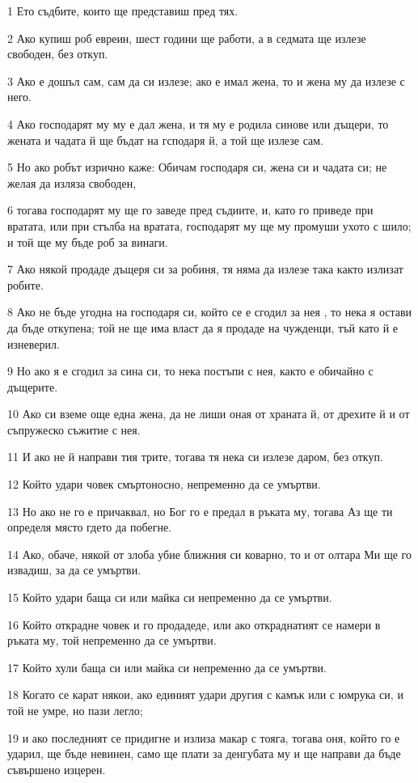 \par 1 Ето съдбите, които ще представиш пред тях.
\par 2 Ако купиш роб евреин, шест години ще работи, а в седмата ще излезе свободен, без откуп.
\par 3 Ако е дошъл сам, сам да си излезе; ако е имал жена, то и жена му да излезе с него.
\par 4 Ако господарят му му е дал жена, и тя му е родила синове или дъщери, то жената и чадата й ще бъдат на гсподаря й, а той ще излезе сам.
\par 5 Но ако робът изрично каже: Обичам господаря си, жена си и чадата си; не желая да изляза свободен,
\par 6 тогава господарят му ще го заведе пред съдиите, и, като го приведе при вратата, или при стълба на вратата, господарят му ще му промуши ухото с шило; и той ще му бъде роб за винаги.
\par 7 Ако някой продаде дъщеря си за робиня, тя няма да излезе така както излизат робите.
\par 8 Ако не бъде угодна на господаря си, който се е сгодил за нея , то нека я остави да бъде откупена; той не ще има власт да я продаде на чужденци, тъй като й е изневерил.
\par 9 Но ако я е сгодил за сина си, то нека постъпи с нея, както е обичайно с дъщерите.
\par 10 Ако си вземе още една жена, да не лиши оная от храната й, от дрехите й и от съпружеско съжитие с нея.
\par 11 И ако не й направи тия трите, тогава тя нека си излезе даром, без откуп.
\par 12 Който удари човек смъртоносно, непременно да се умъртви.
\par 13 Но ако не го е причаквал, но Бог го е предал в ръката му, тогава Аз ще ти определя място гдето да побегне.
\par 14 Ако, обаче, някой от злоба убие ближния си коварно, то и от олтара Ми ще го извадиш, за да се умъртви.
\par 15 Който удари баща си или майка си непременно да се умъртви.
\par 16 Който открадне човек и го продадеде, или ако откраднатият се намери в ръката му, той непременно да се умъртви.
\par 17 Който хули баща си или майка си непременно да се умъртви.
\par 18 Когато се карат някои, ако единият удари другия с камък или с юмрука си, и той не умре, но пази легло;
\par 19 и ако последният се придигне и излиза макар с тояга, тогава оня, който го е ударил, ще бъде невинен, само ще плати за денгубата му и ще направи да бъде съвършено изцерен.
